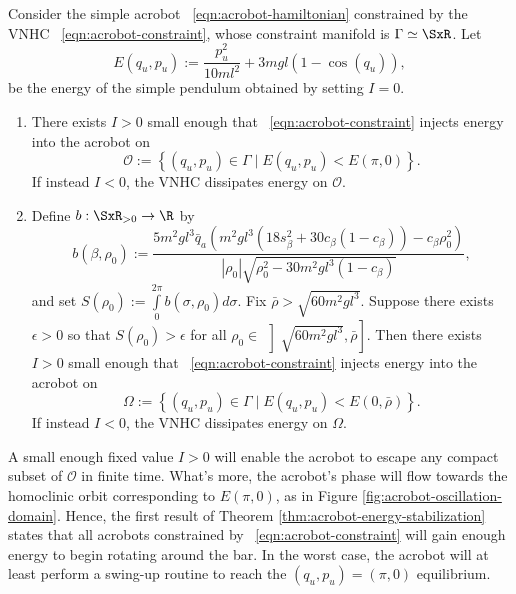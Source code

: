 \begin{thm}\label{thm:acrobot-energy-stabilization}
    Consider the simple acrobot ~\eqref{eqn:acrobot-hamiltonian} constrained by
    the VNHC ~\eqref{eqn:acrobot-constraint}, whose
    constraint manifold is \(\Gamma \simeq \SxR\).
    Let 
    \[
        E(q_u,p_u) := \frac{p_u^2}{10ml^2} + 3mgl(1 - \cos(q_u))
        ,
    \]
    be the energy of the simple pendulum obtained by setting \(I = 0\).
\begin{enumerate}
    \item There exists \(I > 0\) small enough that 
    ~\eqref{eqn:acrobot-constraint} injects energy into the acrobot on
    \[
        \mathcal{O} := \left\{(q_u,p_u) \in \Gamma 
        \mid E(q_u,p_u) < E(\pi,0) \right\}
        .
    \]
    If instead \(I < 0\), the VNHC dissipates energy on \(\mathcal{O}\).
\item Define \(b : \SxR_{> 0} \rightarrow \R\) by
    \[
        b(\beta,\rho_0) := 
        \frac{5m^2 g l^3 \bar{q}_a \left(
            m^2gl^3\left(18s_\beta^2 + 30c_\beta(1 - c_\beta)\right)
            - c_\beta\rho_0^2
        \right)}{
        |\rho_0|\sqrt{\rho_0^2 - 30m^2gl^3(1 - c_\beta)}
        }
        ,
    \]
    and set \(S(\rho_0) := \int \limits_{0}^{2\pi} b(\sigma,\rho_0)d\sigma\).
    Fix \(\bar{\rho} > \sqrt{60m^2gl^3}\).
    Suppose there exists \(\epsilon > 0\) so that \(S(\rho_0) > \epsilon\) for
    all \(\rho_0 \in \, \left]\sqrt{60m^2gl^3}, \bar{\rho}\right]\).
    Then there exists \(I > 0\) small enough that
    ~\eqref{eqn:acrobot-constraint} injects energy into the acrobot on
    \[
        \Omega := \left\{(q_u,p_u) \in \Gamma 
        \mid E(q_u,p_u) < E(0,\bar{\rho})\right\}
        .
    \]
    If instead \(I < 0\), the VNHC dissipates energy on \(\Omega\).
\end{enumerate}
\end{thm}

A small enough fixed value \(I > 0\) will enable the acrobot to 
escape any compact subset of \(\mathcal{O}\) in finite time. 
What's more, the acrobot's phase will flow towards the homoclinic orbit
corresponding to \(E(\pi,0)\), as in Figure
\ref{fig:acrobot-oscillation-domain}.
Hence, the first result of Theorem \ref{thm:acrobot-energy-stabilization} states
that all acrobots constrained by ~\eqref{eqn:acrobot-constraint} 
will gain enough energy to begin rotating around the bar.
In the worst case, the acrobot will at least perform a swing-up routine to reach
the \((q_u,p_u) = (\pi,0)\) equilibrium.

